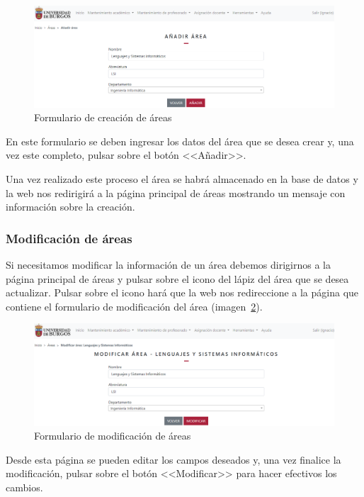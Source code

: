 \begin{figure}
	\centering
	\includegraphics[width=\textwidth]{../img/Anexos/Manual usuario/formArea.png}
	\caption{Formulario de creación de áreas}\label{pag:formArea}
\end{figure}

En este formulario se deben ingresar los datos del área que se desea crear y, una vez este completo, pulsar sobre el botón <<Añadir>>.

Una vez realizado este proceso el área se habrá almacenado en la base de datos y la web nos redirigirá a la página principal de áreas mostrando un mensaje con información sobre la creación.

\subsubsection{Modificación de áreas}
Si necesitamos modificar la información de un área debemos dirigirnos a la página principal de áreas y pulsar sobre el icono del lápiz del área que se desea actualizar.
Pulsar sobre el icono hará que la web nos redireccione a la página que contiene el formulario de modificación del área (imagen~\ref{pag:formModArea}).

\begin{figure}
	\centering
	\includegraphics[width=\textwidth]{../img/Anexos/Manual usuario/formModArea.png}
	\caption{Formulario de modificación de áreas}\label{pag:formModArea}
\end{figure}

Desde esta página se pueden editar los campos deseados y, una vez finalice la modificación, pulsar sobre el botón <<Modificar>> para hacer efectivos los cambios.

